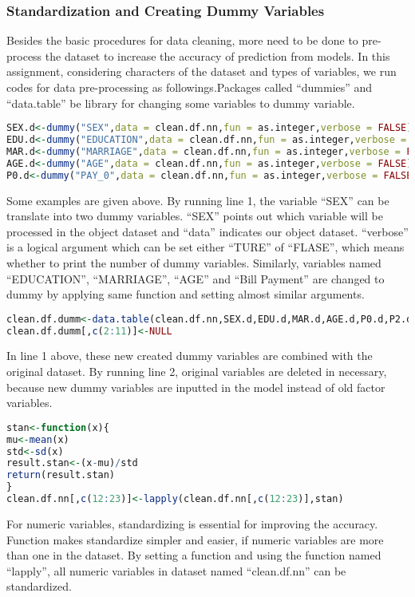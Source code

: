 \documentclass[a4paper,11pt]{article}
\begin{document}
\subsubsection{Standardization and Creating Dummy Variables }
Besides the basic procedures for data cleaning, more need to be done to pre-process the dataset to increase the accuracy of prediction from models. In this assignment, considering characters of the dataset and types of variables, we run codes for data pre-processing as followings.Packages called ``dummies'' and ``data.table'' be library for changing some variables to dummy variable.
\begin{lstlisting}[language=R]
SEX.d<-dummy("SEX",data = clean.df.nn,fun = as.integer,verbose = FALSE)
EDU.d<-dummy("EDUCATION",data = clean.df.nn,fun = as.integer,verbose = FALSE)
MAR.d<-dummy("MARRIAGE",data = clean.df.nn,fun = as.integer,verbose = FALSE)
AGE.d<-dummy("AGE",data = clean.df.nn,fun = as.integer,verbose = FALSE)
P0.d<-dummy("PAY_0",data = clean.df.nn,fun = as.integer,verbose = FALSE)
\end{lstlisting}
Some examples are given above. By running line 1, the variable ``SEX'' can be translate into two dummy variables. ``SEX'' points out which variable will be processed in the object dataset and ``data'' indicates our object dataset. ``verbose'' is a logical argument which can be set either ``TURE'' of ``FLASE'', which means whether to print the number of dummy variables. Similarly, variables named ``EDUCATION'', ``MARRIAGE'', ``AGE'' and ``Bill Payment'' are changed to dummy by applying same function and setting almost similar arguments. 
\begin{lstlisting}[language=R]
clean.df.dumm<-data.table(clean.df.nn,SEX.d,EDU.d,MAR.d,AGE.d,P0.d,P2.d,P3.d,P4.d,P5.d,P6.d)
clean.df.dumm[,c(2:11)]<-NULL
\end{lstlisting}
In line 1 above, these new created dummy variables are combined with the original dataset. By running line 2, original variables are deleted in necessary, because new dummy variables are inputted in the model instead of old factor variables.
\begin{lstlisting}[language=R]
stan<-function(x){
mu<-mean(x)
std<-sd(x)
result.stan<-(x-mu)/std
return(result.stan)
}
clean.df.nn[,c(12:23)]<-lapply(clean.df.nn[,c(12:23)],stan)
\end{lstlisting}
For numeric variables, standardizing is essential for improving the accuracy. Function makes standardize simpler and easier, if numeric variables are more than one in the dataset. By setting a function and using the function named ``lapply'', all numeric variables in dataset named ``clean.df.nn'' can be standardized.
\end{document}
